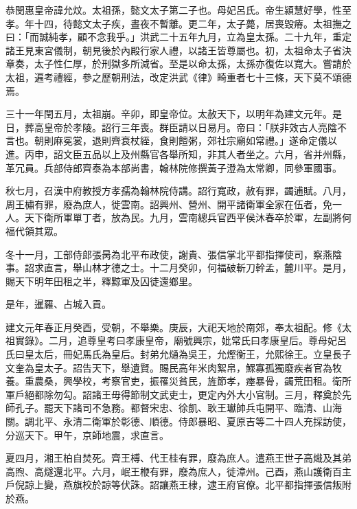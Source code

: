 
\begin{pinyinscope}
恭閔惠皇帝諱允炆。太祖孫，懿文太子第二子也。母妃呂氏。帝生潁慧好學，性至孝。年十四，待懿文太子疾，晝夜不暫離。更二年，太子薨，居喪毀瘠。太祖撫之曰：「而誠純孝，顧不念我乎。」洪武二十五年九月，立為皇太孫。二十九年，重定諸王見東宮儀制，朝見後於內殿行家人禮，以諸王皆尊屬也。初，太祖命太子省決章奏，太子性仁厚，於刑獄多所減省。至是以命太孫，太孫亦復佐以寬大。嘗請於太祖，遍考禮經，參之歷朝刑法，改定洪武《律》畸重者七十三條，天下莫不頌德焉。

三十一年閏五月，太祖崩。辛卯，即皇帝位。太赦天下，以明年為建文元年。是日，葬高皇帝於孝陵。詔行三年喪。群臣請以日易月。帝曰：「朕非效古人亮陰不言也。朝則麻冕裳，退則齊衰杖絰，食則饘粥，郊社宗廟如常禮。」遂命定儀以進。丙申，詔文臣五品以上及州縣官各舉所知，非其人者坐之。六月，省并州縣，革冗員。兵部侍郎齊泰為本部尚書，翰林院修撰黃子澄為太常卿，同參軍國事。

秋七月，召漢中府教授方孝孺為翰林院侍講。詔行寬政，赦有罪，蠲逋賦。八月，周王橚有罪，廢為庶人，徙雲南。詔興州、營州、開平諸衛軍全家在伍者，免一人。天下衛所軍單丁者，放為民。九月，雲南總兵官西平侯沐春卒於軍，左副將何福代領其眾。

冬十一月，工部侍郎張昺為北平布政使，謝貴、張信掌北平都指揮使司，察燕陰事。詔求直言，舉山林才德之士。十二月癸卯，何福破斬刀幹孟，麓川平。是月，賜天下明年田租之半，釋黥軍及囚徒還鄉里。

是年，暹羅、占城入貢。

建文元年春正月癸酉，受朝，不舉樂。庚辰，大祀天地於南郊，奉太祖配。修《太祖實錄》。二月，追尊皇考曰孝康皇帝，廟號興宗，妣常氏曰孝康皇后。尊母妃呂氏曰皇太后，冊妃馬氏為皇后。封弟允熥為吳王，允熞衡王，允熙徐王。立皇長子文奎為皇太子。詔告天下，舉遺賢。賜民高年米肉絮帛，鰥寡孤獨廢疾者官為牧養。重農桑，興學校，考察官吏，振罹災貧民，旌節孝，瘞暴骨，蠲荒田租。衛所軍戶絕都除勿勾。詔諸王毋得節制文武吏士，更定內外大小官制。三月，釋奠於先師孔子。罷天下諸司不急務。都督宋忠、徐凱、耿王瓛帥兵屯開平、臨清、山海關。調北平、永清二衛軍於彰德、順德。侍郎暴昭、夏原吉等二十四人充採訪使，分巡天下。甲午，京師地震，求直言。

夏四月，湘王柏自焚死。齊王榑、代王桂有罪，廢為庶人。遣燕王世子高熾及其弟高煦、高燧還北平。六月，岷王楩有罪，廢為庶人，徙漳州。己酉，燕山護衛百主戶倪諒上變，燕旗校於諒等伏誅。詔讓燕王棣，逮王府官僚。北平都指揮張信叛附於燕。


\end{pinyinscope}
